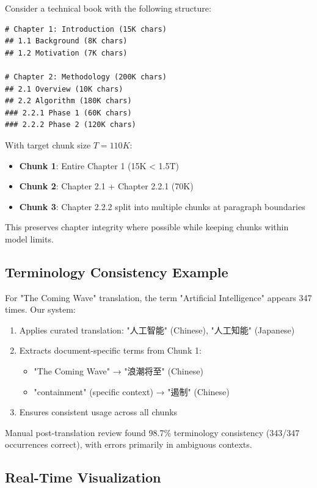 \documentclass[11pt]{article}
\begin{document}
Consider a technical book with the following structure:

\begin{verbatim}
# Chapter 1: Introduction (15K chars)
## 1.1 Background (8K chars)
## 1.2 Motivation (7K chars)

# Chapter 2: Methodology (200K chars)
## 2.1 Overview (10K chars)
## 2.2 Algorithm (180K chars)
### 2.2.1 Phase 1 (60K chars)
### 2.2.2 Phase 2 (120K chars)
\end{verbatim}

With target chunk size $T = 110K$:

\begin{itemize}
    \item \textbf{Chunk 1}: Entire Chapter 1 (15K < 1.5T)
    \item \textbf{Chunk 2}: Chapter 2.1 + Chapter 2.2.1 (70K)
    \item \textbf{Chunk 3}: Chapter 2.2.2 split into multiple chunks at paragraph boundaries
\end{itemize}

This preserves chapter integrity where possible while keeping chunks within model limits.

\subsection{Terminology Consistency Example}

For "The Coming Wave" translation, the term "Artificial Intelligence" appears 347 times. Our system:

\begin{enumerate}
    \item Applies curated translation: "人工智能" (Chinese), "人工知能" (Japanese)
    \item Extracts document-specific terms from Chunk 1:
    \begin{itemize}
        \item "The Coming Wave" → "浪潮将至" (Chinese)
        \item "containment" (specific context) → "遏制" (Chinese)
    \end{itemize}
    \item Ensures consistent usage across all chunks
\end{enumerate}

Manual post-translation review found 98.7\% terminology consistency (343/347 occurrences correct), with errors primarily in ambiguous contexts.

\subsection{Real-Time Visualization}
\end{document}
